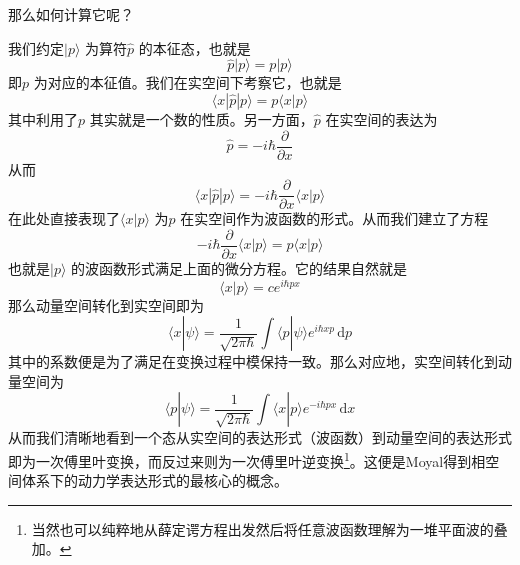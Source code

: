 \documentclass[12pt,a4paper,openany,twoside]{book}
\numberwithin{equation}{section}
\newcommand{\ud}{\mathrm{d}}
\begin{document}
        那么如何计算它呢？

        我们约定$| p \rangle $ 为算符$\hat{p}$ 的本征态，也就是
        \begin{equation*}
          \hat{p} | p \rangle = p | p \rangle 
        \end{equation*} 
        即$p$ 为对应的本征值。我们在实空间下考察它，也就是
        \begin{equation*}
          \langle x | \hat{p} | p \rangle = p \langle x | p \rangle 
        \end{equation*} 
        其中利用了$p$ 其实就是一个数的性质。另一方面，$\hat{p}$ 在实空间的表达为
        \begin{equation}
          \hat{p} = - i \hbar \frac{\partial }{\partial x} 
        \end{equation}
        从而
        \begin{equation*}
          \langle x | \hat{p} | p \rangle = - i\hbar \frac{\partial }{\partial x} \langle x | p \rangle 
        \end{equation*} 
        在此处直接表现了$\langle x | p \rangle$ 为$p$ 在实空间作为波函数的形式。从而我们建立了方程
        \begin{equation}
          -i\hbar \frac{\partial }{\partial x} \langle x | p \rangle = p \langle x | p \rangle 
        \end{equation} 
        也就是$| p \rangle $ 的波函数形式满足上面的微分方程。它的结果自然就是
        \begin{equation}
          \langle x | p \rangle = c e^{i\hbar p x}
        \end{equation}
        那么动量空间转化到实空间即为
        \begin{equation}
          \langle x | \psi \rangle  = \frac{1}{\sqrt{2\pi \hbar}}\int \langle p | \psi \rangle e^{i\hbar x p} \, \ud p 
        \end{equation}
        其中的系数便是为了满足在变换过程中模保持一致。那么对应地，实空间转化到动量空间为
        \begin{equation}
          \langle p | \psi \rangle = \frac{1}{\sqrt{2\pi \hbar}} \int \langle x | p \rangle e^{-i\hbar p x} \, \ud x 
        \end{equation}
        从而我们清晰地看到一个态从实空间的表达形式（波函数）到动量空间的表达形式即为一次傅里叶变换，而反过来则为一次傅里叶逆变换\footnote{ 当然也可以纯粹地从薛定谔方程出发然后将任意波函数理解为一堆平面波的叠加。}。这便是Moyal得到相空间体系下的动力学表达形式的最核心的概念。
\end{document}
